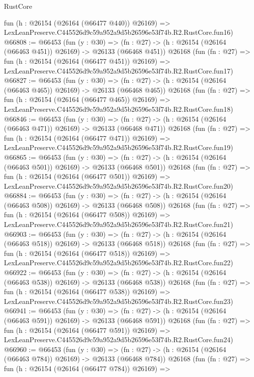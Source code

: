\begin{lexlean}{RustCore}
\begin{coremodule}
    fun (h : @26154 (@26164 (@66477 @440)) @26169) =>
    LexLeanPreserve.C445526d9c59a952a9d5b26596e53f74b.R2.RustCore.fun16)
@66808 := @66453
    (fun (y : @30) =>
    (fn : @27) -> (h : @26154 (@26164 (@66463 @451)) @26169) -> @26133 (@66468 @451))
    @26168
    (fun (fn : @27) =>
    fun (h : @26154 (@26164 (@66477 @451)) @26169) =>
    LexLeanPreserve.C445526d9c59a952a9d5b26596e53f74b.R2.RustCore.fun17)
@66827 := @66453
    (fun (y : @30) =>
    (fn : @27) -> (h : @26154 (@26164 (@66463 @465)) @26169) -> @26133 (@66468 @465))
    @26168
    (fun (fn : @27) =>
    fun (h : @26154 (@26164 (@66477 @465)) @26169) =>
    LexLeanPreserve.C445526d9c59a952a9d5b26596e53f74b.R2.RustCore.fun18)
@66846 := @66453
    (fun (y : @30) =>
    (fn : @27) -> (h : @26154 (@26164 (@66463 @471)) @26169) -> @26133 (@66468 @471))
    @26168
    (fun (fn : @27) =>
    fun (h : @26154 (@26164 (@66477 @471)) @26169) =>
    LexLeanPreserve.C445526d9c59a952a9d5b26596e53f74b.R2.RustCore.fun19)
@66865 := @66453
    (fun (y : @30) =>
    (fn : @27) -> (h : @26154 (@26164 (@66463 @501)) @26169) -> @26133 (@66468 @501))
    @26168
    (fun (fn : @27) =>
    fun (h : @26154 (@26164 (@66477 @501)) @26169) =>
    LexLeanPreserve.C445526d9c59a952a9d5b26596e53f74b.R2.RustCore.fun20)
@66884 := @66453
    (fun (y : @30) =>
    (fn : @27) -> (h : @26154 (@26164 (@66463 @508)) @26169) -> @26133 (@66468 @508))
    @26168
    (fun (fn : @27) =>
    fun (h : @26154 (@26164 (@66477 @508)) @26169) =>
    LexLeanPreserve.C445526d9c59a952a9d5b26596e53f74b.R2.RustCore.fun21)
@66903 := @66453
    (fun (y : @30) =>
    (fn : @27) -> (h : @26154 (@26164 (@66463 @518)) @26169) -> @26133 (@66468 @518))
    @26168
    (fun (fn : @27) =>
    fun (h : @26154 (@26164 (@66477 @518)) @26169) =>
    LexLeanPreserve.C445526d9c59a952a9d5b26596e53f74b.R2.RustCore.fun22)
@66922 := @66453
    (fun (y : @30) =>
    (fn : @27) -> (h : @26154 (@26164 (@66463 @538)) @26169) -> @26133 (@66468 @538))
    @26168
    (fun (fn : @27) =>
    fun (h : @26154 (@26164 (@66477 @538)) @26169) =>
    LexLeanPreserve.C445526d9c59a952a9d5b26596e53f74b.R2.RustCore.fun23)
@66941 := @66453
    (fun (y : @30) =>
    (fn : @27) -> (h : @26154 (@26164 (@66463 @591)) @26169) -> @26133 (@66468 @591))
    @26168
    (fun (fn : @27) =>
    fun (h : @26154 (@26164 (@66477 @591)) @26169) =>
    LexLeanPreserve.C445526d9c59a952a9d5b26596e53f74b.R2.RustCore.fun24)
@66960 := @66453
    (fun (y : @30) =>
    (fn : @27) -> (h : @26154 (@26164 (@66463 @784)) @26169) -> @26133 (@66468 @784))
    @26168
    (fun (fn : @27) =>
    fun (h : @26154 (@26164 (@66477 @784)) @26169) =>

\end{coremodule}
\end{lexlean}
